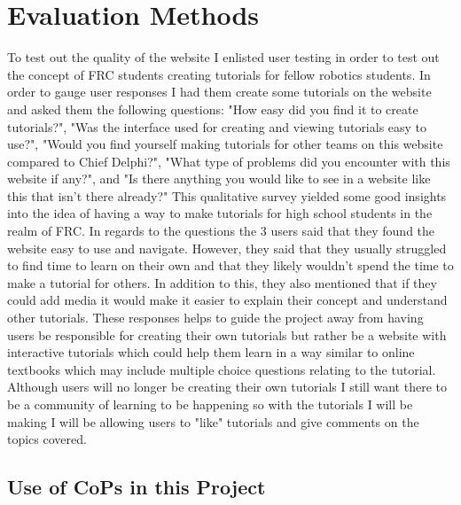\documentclass[10pt,twocolumn]{article}
\begin{document}
\section{Evaluation Methods}
To test out the quality of the website I enlisted user testing in order to test out the concept of FRC students creating tutorials for fellow robotics students. In order to gauge user responses I had them create some tutorials on the website and asked them the following questions: "How easy did you find it to create tutorials?", "Was the interface used for creating and viewing tutorials easy to use?", "Would you find yourself making tutorials for other teams on this website compared to Chief Delphi?", "What type of problems did you encounter with this website if any?", and "Is there anything you would like to see in a website like this that isn't there already?" This qualitative survey yielded some good insights into the idea of having a way to make tutorials for high school students in the realm of FRC. In regards to the questions the 3 users said that they found the website easy to use and navigate. However, they said that they usually struggled to find time to learn on their own and that they likely wouldn't spend the time to make a tutorial for others. In addition to this, they also mentioned that if they could add media it would make it easier to explain their concept and understand other tutorials. These responses helps to guide the project away from having users be responsible for creating their own tutorials but rather be a website with interactive tutorials which could help them learn in a way similar to online textbooks which may include multiple choice questions relating to the tutorial. Although users will no longer be creating their own tutorials I still want there to be a community of learning to be happening so with the tutorials I will be making I will be allowing users to "like" tutorials and give comments on the topics covered.

\subsection{Use of CoPs in this Project}
\end{document}
